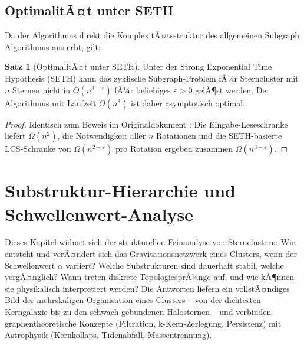 ﻿\documentclass[a4paper,12pt]{report}
\theoremstyle{definition}
\newtheorem{satz}{Satz}
\begin{document}
\section{OptimalitÃ¤t unter SETH}

Da der Algorithmus direkt die KomplexitÃ¤tsstruktur des allgemeinen Subgraph Algorithmus aus \cite{epp2026} erbt, gilt:

\begin{satz}[OptimalitÃ¤t unter SETH]
Unter der Strong Exponential Time Hypothesis (SETH) kann das zyklische Subgraph-Problem fÃ¼r Sterncluster mit $n$ Sternen nicht in $O(n^{3-\varepsilon})$ fÃ¼r beliebiges $\varepsilon > 0$ gelÃ¶st werden. Der Algorithmus mit Laufzeit $\Theta(n^3)$ ist daher asymptotisch optimal.
\end{satz}

\begin{proof}
Identisch zum Beweis im Originaldokument \cite{epp2026}: Die Eingabe-Leseschranke liefert $\Omega(n^2)$, die Notwendigkeit aller $n$ Rotationen und die SETH-basierte LCS-Schranke von $\Omega(n^{2-\varepsilon})$ pro Rotation ergeben zusammen $\Omega(n^{3-\varepsilon})$.
\end{proof}

\chapter{Substruktur-Hierarchie und Schwellenwert-Analyse}
\label{chap:hierarchie}

Dieses Kapitel widmet sich der strukturellen Feinanalyse von Sternclustern: Wie entsteht und verÃ¤ndert sich das Gravitationsnetzwerk eines Clusters, wenn der Schwellenwert $\alpha$ variiert? Welche Substrukturen sind dauerhaft stabil, welche vergÃ¤nglich? Wann treten diskrete TopologiesprÃ¼nge auf, und wie kÃ¶nnen sie physikalisch interpretiert werden? Die Antworten liefern ein vollstÃ¤ndiges Bild der mehrskaligen Organisation eines Clusters -- von der dichtesten Kerngalaxie bis zu den schwach gebundenen Halosternen -- und verbinden graphentheoretische Konzepte (Filtration, k-Kern-Zerlegung, Persistenz) mit Astrophysik (Kernkollaps, Tidenabfall, Massentrennung).
\end{document}
